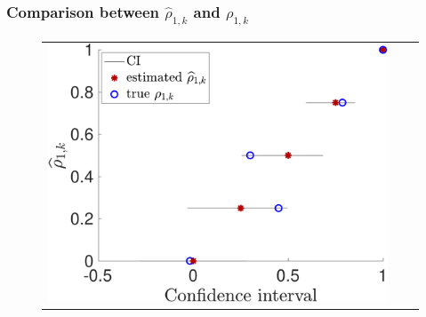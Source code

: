 \documentclass{beamer}
\begin{document}
\begin{frame}[t]
    \frametitle{Comparison between $\widehat \rho_{1,k}$ and $\rho_{1,k}$}

%
\begin{figure}[!b]\centering
\begin{tabular}{ccc}
\includegraphics[width=0.3\linewidth]{./figures/Compare_true_estimate_rho_2.pdf}
\end{tabular}
\label{fig:CI_plot} 
\end{figure}
%



\end{frame}
\end{document}
